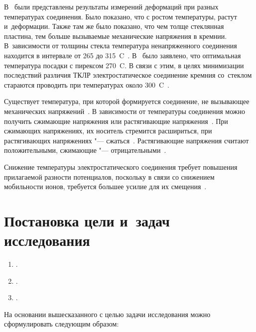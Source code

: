 В~\cite{Cozma_Puers_1995} были представлены результаты измерений деформаций при разных температурах соединения. Было показано, что с ростом температуры, растут и~деформации. Также там же было показано, что чем толще стеклянная пластина, тем больше вызываемые механические напряжения в кремнии. В~зависимости от толщины стекла температура ненапряженного соединения находится в интервале от 265 до 315~{\textdegree}C~\cite{Cozma_Puers_1995}. В~\cite{ettouhami1996thermal} было заявлено, что оптимальная температура посадки с пирексом 270~{\textdegree}C. В связи с этим, в целях минимизации последствий различия ТКЛР электростатическое соединение кремния со~стеклом
стараются проводить при температурах около 300~{\textdegree}C~\cite{Low_temp_wafer_AB}.

Существует температура, при которой формируется соединение, не вызывающее механических напряжений~\cite{Cozma_Puers_1995}. В зависимости от температуры соединения можно получить сжимающие напряжения или растягивающие напряжения~\cite{Cozma_Puers_1995}. При сжимающих напряжениях, их носитель стремится расшириться, при растягивающих напряжениях "--- сжаться~\cites[19]{mehan_napr_plenki1981obzor}. Растягивающие напряжения считают положительными, сжимающие "--- отрицательными~\cites[5]{mehan_napr_plenki1981obzor}.

Снижение температуры электростатического соединения требует повышения прилагаемой разности потенциалов, поскольку в связи со снижением мобильности ионов, требуется большее усилие для их смещения~\cite{Low_temp_wafer_AB, Cozma_Puers_1995}.

\section{Постановка цели и~задач исследования}

%
\beforenedostati{}
\beforenedostatii{}
\begin{enumerate}
    \item \nedostati{}.
    \item \nedostatii{}.
    \item \nedostatiii{}.
\end{enumerate}

На основании вышесказанного с целью
\MakeLowercase{\protect\aimTextContentRod{}}
задачи исследования можно сформулировать следующим образом:
\begin{enumerate}

\end{enumerate}

